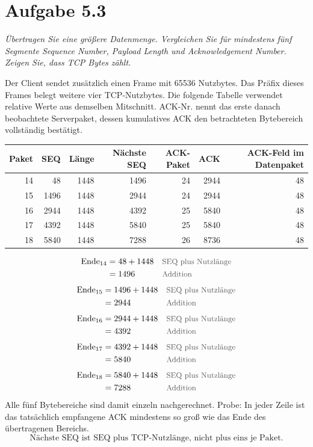 \documentclass[a4paper,11pt]{article}
\newif\ifexplain
\newcommand{\aufgabe}[1]{\section*{Aufgabe #1}}
\newcommand{\angabe}[1]{\textit{#1}\par\smallskip}
\newcommand{\why}[1]{\text{\small\color{black!65}#1}}
\newcommand{\explain}[1]{\ifexplain\begin{erklbox}#1\end{erklbox}\fi}
\begin{document}
\aufgabe{5.3}
\angabe{Übertragen Sie eine größere Datenmenge. Vergleichen Sie für mindestens fünf Segmente Sequence Number, Payload Length und Acknowledgement Number. Zeigen Sie, dass TCP Bytes zählt.}

Der Client sendet zusätzlich einen Frame mit 65536 Nutzbytes.
Das Präfix dieses Frames belegt weitere vier TCP-Nutzbytes.
Die folgende Tabelle verwendet relative Werte aus demselben Mitschnitt.
ACK-Nr. nennt das erste danach beobachtete Serverpaket, dessen kumulatives ACK
den betrachteten Bytebereich vollständig bestätigt.
\begin{center}\small\begin{tabular}{rrrrrrr}\toprule
Paket & SEQ & Länge & Nächste SEQ & ACK-Paket & ACK & ACK-Feld im Datenpaket\\\midrule
14 & 48 & 1448 & 1496 & 24 & 2944 & 48\\
15 & 1496 & 1448 & 2944 & 24 & 2944 & 48\\
16 & 2944 & 1448 & 4392 & 25 & 5840 & 48\\
17 & 4392 & 1448 & 5840 & 25 & 5840 & 48\\
18 & 5840 & 1448 & 7288 & 26 & 8736 & 48\\
\bottomrule\end{tabular}\end{center}
\begin{align*}
\mathrm{Ende}_{14} &= 48+1448 && \why{SEQ plus Nutzlänge}\\
&= 1496 && \why{Addition}
\end{align*}
\begin{align*}
\mathrm{Ende}_{15} &= 1496+1448 && \why{SEQ plus Nutzlänge}\\
&= 2944 && \why{Addition}
\end{align*}
\begin{align*}
\mathrm{Ende}_{16} &= 2944+1448 && \why{SEQ plus Nutzlänge}\\
&= 4392 && \why{Addition}
\end{align*}
\begin{align*}
\mathrm{Ende}_{17} &= 4392+1448 && \why{SEQ plus Nutzlänge}\\
&= 5840 && \why{Addition}
\end{align*}
\begin{align*}
\mathrm{Ende}_{18} &= 5840+1448 && \why{SEQ plus Nutzlänge}\\
&= 7288 && \why{Addition}
\end{align*}
Alle fünf Bytebereiche sind damit einzeln nachgerechnet.
Probe: In jeder Zeile ist das tatsächlich empfangene ACK
mindestens so groß wie das Ende des übertragenen Bereichs.
\[\boxed{\text{Nächste SEQ ist SEQ plus TCP-Nutzlänge, nicht plus eins je Paket.}}\]
\explain{Ein ACK von 1001 sagt: Alle Bytes vor 1001 sind angekommen, als
Nächstes fehlt Byte 1001. Es ist keine Paketnummer. Wenn ein ACK gleich
mehrere Segmente bestätigt, steht deshalb nicht für jedes Segment ein eigenes
ACK im Mitschnitt. Der ACK-Wert im Datenpaket selbst bestätigt die Gegenrichtung;
er gehört nicht zur eigenen Payload. Das Vier-Byte-Längenpräfix ist für TCP
normale Nutzlast und zählt daher ebenfalls mit.}
\end{document}
